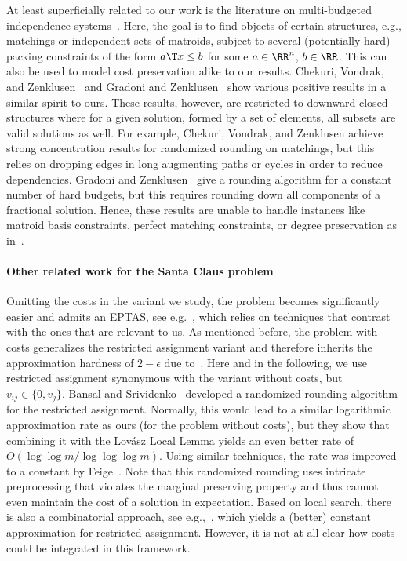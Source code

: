 \documentclass[a4paper,USenglish,cleveref,thm-restate]{lipics-v2021}
\begin{document}
At least superficially related to our work is the literature on multi-budgeted
independence systems~\cite{ChekuriVZ11, GrandoniZ10}.
Here, the goal is to find objects of certain structures, e.g.,
matchings or independent sets of matroids,
subject to several (potentially hard) packing constraints
of the form
$a\T x\le b$ for some $a\in \RR^n$, $b\in \RR$.
This can also be used to model cost preservation alike to our
results.
Chekuri, Vondrak, and Zenklusen~\cite{ChekuriVZ11}
and Gradoni and Zenklusen~\cite{GrandoniZ10}
show various positive results in a similar spirit to ours.
These results, however, are restricted to downward-closed structures where for a given solution, formed by a
set of elements, all subsets are valid solutions as well.
For example, Chekuri, Vondrak, and Zenklusen achieve
strong concentration results for randomized rounding on matchings, but this relies on dropping edges in long augmenting paths or cycles in order to reduce dependencies.
Gradoni and Zenklusen~\cite{GrandoniZ10} give a rounding algorithm for a constant number of hard budgets, but
this requires rounding down all components of a fractional solution.
Hence, these results are unable to handle instances like matroid basis constraints, perfect matching constraints, or degree preservation as in~.


\paragraph*{Other related work for the Santa Claus problem}
Omitting the costs in the variant we study, the problem
becomes significantly easier and admits an EPTAS, see e.g.~\cite{JansenKV20}, which relies on techniques that contrast with the ones that are relevant to us.
As mentioned before, the problem with costs generalizes
the restricted assignment variant and therefore
inherits the approximation hardness of $2-\epsilon$ due to~\cite{BansalS06}.
Here and in the following, we use restricted assignment synonymous
with the variant without costs, but $v_{ij}\in \{0, v_j\}$.
Bansal and Srividenko~\cite{BansalS06} developed a randomized rounding algorithm for the restricted assignment.
Normally, this would lead
to a similar logarithmic approximation rate as ours
(for the problem without costs),
but they show that combining it
with the Lov\'asz Local Lemma yields an even better rate of
$O(\log\log m/ \log\log\log m)$.
Using similar techniques, the rate was improved to a constant by Feige~\cite{Feige08}.
Note that this randomized rounding uses intricate preprocessing
that violates the marginal preserving property and thus cannot even
maintain the cost of a solution in expectation.
Based on local search, there is also a combinatorial approach, 
see e.g.,~\cite{BamasLMRS24, AsadpourFS08, AnnamalaiKS17},
which yields a (better) constant approximation for restricted
assignment. However, it is not at all clear how costs could be
integrated in this framework.
\end{document}
